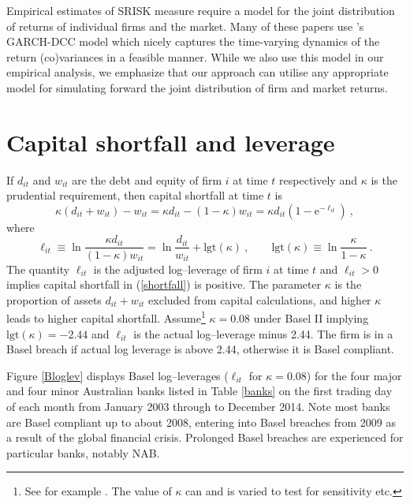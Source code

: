 \documentclass[authoryear]{elsarticle}
\newcommand{\logit}{\mathrm{lgt}}
\newcommand{\e}{\mathrm{e}}
\newcommand{\eref}[1]{(\ref{#1})}
\newcommand{\fref}[1]{Figure \ref{#1}}
\newcommand{\tref}[1]{Table \ref{#1}}
\newcommand{\cq}{\ , \qquad}
\newcommand{\be}[1]{\begin{equation}\label{#1}}
\newcommand{\ee}{\end{equation}}
\begin{document}
Empirical estimates of SRISK measure require a model for the joint distribution of returns of individual firms and the market. Many of these papers use \cite{engle2002dynamic}'s GARCH-DCC model which nicely captures the time-varying dynamics of the return (co)variances in a feasible manner. While we also use this model in our empirical analysis, we emphasize that our approach can utilise any appropriate model for simulating forward the joint distribution of firm and market returns. 


\section{Capital shortfall and leverage}\label{capshort}

If $d_{it}$ and $w_{it}$ are the debt and equity of firm $i$ at time $t$ respectively and $\kappa$ is the prudential requirement,  then  capital shortfall at time $t$ is
\be{shortfall}
\kappa(d_{it}+w_{it}) - w_{it} = \kappa d_{it}  - (1-\kappa) w_{it} = \kappa d_{it}\left(1-\e^{-\ell_{it}}\right)\ ,
\ee
where
$$
\ell_{it} \equiv  \ln\frac{\kappa d_{it}}{(1-\kappa)w_{it}}= \ln\frac{d_{it}}{w_{it}}+\logit(\kappa) \cq \logit(\kappa)\equiv \ln \frac{\kappa}{1-\kappa} \ .
$$
The quantity $\ell_{it}$ is the adjusted log--leverage of firm $i$ at time $t$ and $\ell_{it}>0$ implies capital shortfall in \eref{shortfall} is positive. The parameter $\kappa$ is the proportion of assets $d_{it}+w_{it}$ excluded from capital calculations, and higher $\kappa$ leads to higher capital shortfall.
Assume\footnote{See for example \cite{brownlees2015}.   The value of $\kappa$ can and is varied to test for sensitivity etc.} $\kappa=0.08$ under Basel II implying $\logit(\kappa)=-2.44$ and  $\ell_{it}$ is the actual log--leverage minus 2.44.
The firm is in a Basel breach if actual  log leverage is above 2.44, otherwise it is Basel compliant.

\fref{Bloglev} displays Basel log--leverages ($\ell_{it}$ for $\kappa=0.08$) for the four major and four minor Australian banks listed in \tref{banks} on the first trading day of each month from January 2003  through to December 2014.  Note most banks are Basel compliant up to about 2008, entering into Basel breaches from 2009 as a result of the global financial crisis. Prolonged Basel breaches are experienced for particular banks, notably NAB.
\end{document}
